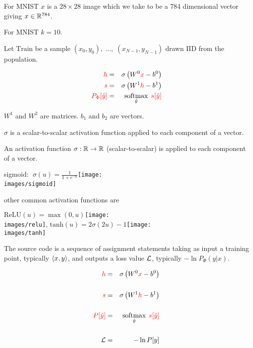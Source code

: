 {\vfill
For MNIST $x$ is a $28 \times 28$ image which we take to be a 784 dimensional vector giving $x \in \mathbb{R}^{784}$.

\vfill
For MNIST $k = 10$.

\vfill
Let $\mathrm{Train}$ be a sample $(x_0,y_0),\;\ldots,\;(x_{N-1},y_{N-1})$ drawn IID from the population.

\begin{eqnarray*}
  {\color{red} h} & = & \sigma\left(W^0{\color{red} x} - b^0\right) \\
  {\color{red} s} & = & \sigma\left(W^1{\color{red} h} - b^1 \right) \\
  {\color{red} P_\Phi[\hat{y}]} & = & \operatorname*{softmax}_{\hat{y}}\;{\color{red} s[\hat{y}]}
\end{eqnarray*}

\vfill
$W^1$ and $W^2$ are matrices. $b_1$ and $b_2$ are vectors.

\vfill
$\sigma$ is a scalar-to-scalar activation function applied to each component of a vector.


An activation function $\sigma:\mathbb{R} \rightarrow \mathbb{R}$ (scalar-to-scalar) is applied to each component of a vector.

\vfill
\centerline{{\color{red} sigmoid: $\;\sigma(u) = \frac{1}{1+e^{-u}}$}\hspace{1em}\texttt{[image: \\images/sigmoid]}}

\vfill
other common activation functions are

\vfill
\centerline{{\color{red} $\mathrm{ReLU}(u) = \max(0,u)$}\texttt{[image: \\images/relu]},
{\color{red} $\mathrm{tanh}(u) = 2\sigma(2u)-1$}\texttt{[image: \\images/tanh]}}


The source code is a sequence of assignment statements taking as input a training point, typically ${\mbox{$\langle x,y\rangle$}}$,
and outputs a loss value ${\cal L}$, typically $-\ln P_\Phi(y|x)$.

\begin{eqnarray*}
  {\color{red} h} & = & \sigma\left(W^0{\color{red} x} - b^0\right) \\
  \\
  {\color{red} s} & = & \sigma\left(W^1{\color{red} h} - b^1 \right) \\
  \\
  {\color{red} P[\hat{y}]} & = & \operatorname*{softmax}_{\hat{y}}\;{\color{red} s[\hat{y}]} \\
  \\
  {\cal L} & = & - \ln P[y]
\end{eqnarray*}

}
